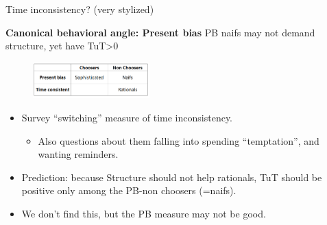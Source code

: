 \documentclass[9pt, aspectratio=169]{beamer}
\begin{document}
\begin{frame}{Time inconsistency? (very stylized)}

 \textbf{Canonical behavioral angle: Present bias}  PB naifs may not demand structure, yet have TuT>0

\begin{figure}[H]
    \begin{center}
        \centering
        \includegraphics[width=0.4\textwidth]{Figuras/hyperbolicity_strata.png}
    \end{center}
\end{figure}   
    \pause \begin{itemize}
    \item Survey ``switching'' measure of time inconsistency. %
    \begin{itemize}
        \item Also questions about them falling into spending ``temptation'', and wanting reminders.
    \end{itemize}
     
    \vfill \item  Prediction: because Structure should not help rationals, TuT should be positive only among the PB-non choosers (=naifs).   
    \item We don't find this,  but the PB measure may not be good.
    
    \end{itemize}
\end{frame}
\end{document}
